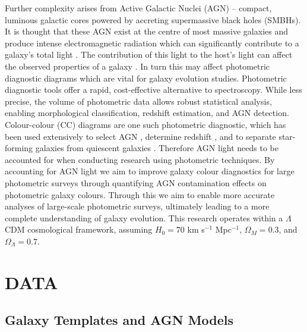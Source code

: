 \documentclass[
  journal=pasa,
  manuscript=research-paper,
  year=202X,
  volume=YY,
]{cup-journal}
\begin{document}
Further complexity arises from Active Galactic Nuclei (AGN) – compact, luminous galactic cores powered by accreting supermassive black holes (SMBHs). It is thought that these AGN exist at the centre of most massive galaxies and produce intense electromagnetic radiation which can significantly contribute to a galaxy's total light \citep{elvis_atlas_1994}. The contribution of this light to the host's light can affect the observed properties of a galaxy \citep{cowley_decoupled_2018}. In turn this may affect photometric diagnostic diagrams which are vital for galaxy evolution studies. Photometric diagnostic tools offer a rapid, cost-effective alternative to spectroscopy. While less precise, the volume of photometric data allows robust statistical analysis, enabling morphological classification, redshift estimation, and AGN detection. Colour-colour (CC) diagrams are one such photometric diagnostic, which has been used extensively to select AGN \citep{lacy_obscured_2004, messias_dependency_2014, donley_spitzer_2007}, determine redshift \citep{giavalisco_lyman-break_2002}, and to separate star-forming galaxies from quiescent galaxies \citep{whitaker_newfirm_2011}. Therefore AGN light needs to be accounted for when conducting research using photometric techniques. By accounting for AGN light we aim to improve galaxy colour diagnostics for large photometric surveys through quantifying AGN contamination effects on photometric galaxy colours. Through this we aim to enable more accurate analyses of large-scale photometric surveys, ultimately leading to a more complete understanding of galaxy evolution. This research operates within a $\Lambda$CDM cosmological framework, assuming $H_0 = 70$ km s$^{-1}$ Mpc$^{-1}$, $\Omega_M = 0.3$, and $\Omega_{\Lambda} = 0.7$.

\section{DATA}
\label{sec:data}

\subsection{Galaxy Templates and AGN Models}
\label{subsec:templates}
\end{document}
